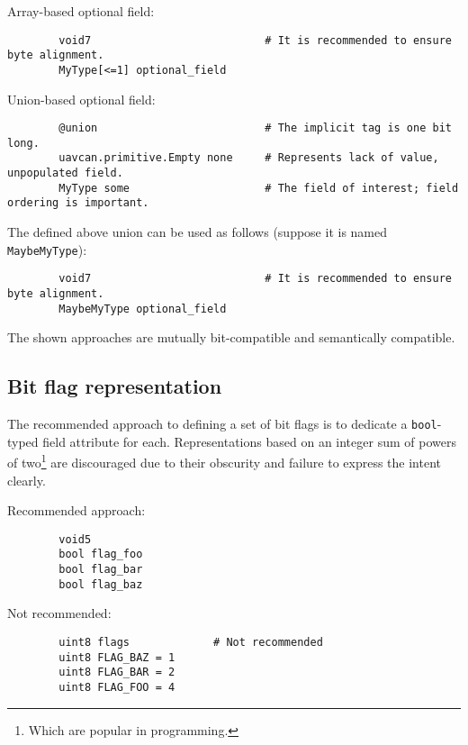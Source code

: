\begin{remark}[breakable]
    Array-based optional field:

    \begin{verbatim}
        void7                           # It is recommended to ensure byte alignment.
        MyType[<=1] optional_field
    \end{verbatim}

    Union-based optional field:

    \begin{verbatim}
        @union                          # The implicit tag is one bit long.
        uavcan.primitive.Empty none     # Represents lack of value, unpopulated field.
        MyType some                     # The field of interest; field ordering is important.
    \end{verbatim}

    The defined above union can be used as follows (suppose it is named \verb|MaybeMyType|):

    \begin{verbatim}
        void7                           # It is recommended to ensure byte alignment.
        MaybeMyType optional_field
    \end{verbatim}

    The shown approaches are mutually bit-compatible and semantically compatible.
\end{remark}

\subsection{Bit flag representation}

The recommended approach to defining a set of bit flags is to dedicate a \verb|bool|-typed field attribute for each.
Representations based on an integer sum of powers of two\footnote{Which are popular in programming.}
are discouraged due to their obscurity and failure to express the intent clearly.

\begin{remark}
    Recommended approach:

    \begin{verbatim}
        void5
        bool flag_foo
        bool flag_bar
        bool flag_baz
    \end{verbatim}

    Not recommended:

    \begin{verbatim}
        uint8 flags             # Not recommended
        uint8 FLAG_BAZ = 1
        uint8 FLAG_BAR = 2
        uint8 FLAG_FOO = 4
    \end{verbatim}
\end{remark}
